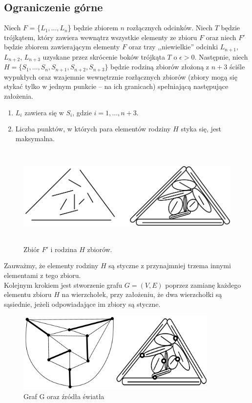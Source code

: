 \documentclass[brudnopis]{xmgr}
\theoremstyle{definition}
\begin{document}
\subsection{Ograniczenie górne}
\indent Niech $F$ = \{$L_1, \ldots, L_n$\} będzie zbiorem $n$ rozłącznych odcinków. Niech $T$ będzie trójkątem, który zawiera wewnątrz wszystkie elementy ze zbioru $F$ oraz niech $F'$ będzie zbiorem zawierającym elementy $F$ oraz trzy ,,niewielkie'' odcinki $L_{n+1}$, $L_{n+2}$, $L_{n+3}$ uzyskane przez skrócenie boków trójkąta $T$ o $\epsilon > 0$.
Następnie, niech $H = \{S_1,\ldots,S_n,S_{n+1},S_{n+2},S_{n+3}\}$ będzie rodziną zbiorów złożoną z $n + 3$ ściśle wypukłych oraz wzajemnie wewnętrznie rozłącznych zbiorów (zbiory mogą się stykać tylko w jednym punkcie -- na ich granicach) spełniającą następujące założenia.
\begin{enumerate}
  \item $L_i$ zawiera się w $S_i$, gdzie $i = 1,\ldots,n+3$.
  \item Liczba punktów, w których para elementów rodziny $H$ styka się, jest maksymalna.
\end{enumerate}
\begin{figure}[ht!]
 \centering
  \includegraphics[height=5cm, width=13.5cm]{rysunki/podswietlenie.png}
  \caption{Zbiór $F'$ i rodzina $H$ zbiorów.}
\end{figure} 
Zauważmy, że elementy rodziny $H$ są styczne z przynajmniej trzema innymi elementami z tego zbioru. 
\\\indent Kolejnym krokiem jest stworzenie grafu $G=(V,E)$ poprzez zamianę każdego elementu zbioru $H$ na wierzchołek, przy założeniu, że dwa wierzchołki są sąsiednie, jeżeli odpowiadające im zbiory są styczne.
\begin{figure}[ht!]
 \centering
  \includegraphics[height=4cm]{rysunki/skojarzenia_zrodla_swiatla.png}
  \caption{Graf G oraz źródła światła}
\end{figure}
\end{document}
